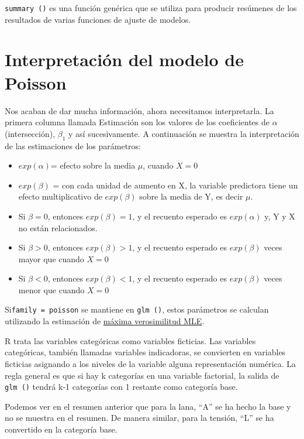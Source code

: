 \documentclass[
]{book}
\begin{document}
\texttt{summary\ ()} es una función genérica que se utiliza para producir resúmenes de los resultados de varias funciones de ajuste de modelos.

\hypertarget{interpretaciuxf3n-del-modelo-de-poisson}{%
\section{Interpretación del modelo de Poisson}\label{interpretaciuxf3n-del-modelo-de-poisson}}

Nos acaban de dar mucha información, ahora necesitamos interpretarla. La primera columna llamada Estimación son los valores de los coeficientes de \(\alpha\)(intersección), \(\beta_1\) y así sucesivamente. A continuación se muestra la interpretación de las estimaciones de los parámetros:

\begin{itemize}
\item
  \(exp(\alpha)\)= efecto sobre la media \(\mu\), cuando \(X=0\)
\item
  \(exp(\beta)\) = con cada unidad de aumento en X, la variable predictora tiene un efecto multiplicativo de \(exp(\beta)\) sobre la media de Y, es decir \(\mu\).
\item
  Si \(\beta=0\), entonces \(exp(\beta)=1\), y el recuento esperado es \(exp(\alpha)\) y, Y y X no están relacionados.\\
\item
  Si \(\beta >0\), entonces \(exp(\beta)>1\), y el recuento esperado es \(exp(\beta)\) veces mayor que cuando \(X=0\)
\item
  Si \(\beta < 0\), entonces \(exp(\beta)<1\), y el recuento esperado es \(exp(\beta)\) veces menor que cuando \(X=0\)
\end{itemize}

Si\texttt{family\ =\ poisson} se mantiene en \texttt{glm\ ()}, estos parámetros se calculan utilizando la estimación de \href{máxima\%20verosimilitud\%20MLE}{máxima verosimilitud MLE}.

R trata las variables categóricas como variables ficticias. Las variables categóricas, también llamadas variables indicadoras, se convierten en variables ficticias asignando a los niveles de la variable alguna representación numérica. La regla general es que si hay k categorías en una variable factorial, la salida de \texttt{glm\ ()} tendrá k-1 categorías con 1 restante como categoría base.

Podemos ver en el resumen anterior que para la lana, ``A'' se ha hecho la base y no se muestra en el resumen. De manera similar, para la tensión, ``L'' se ha convertido en la categoría base.
\end{document}
